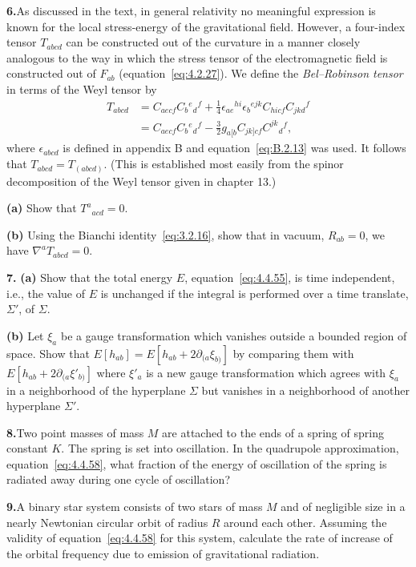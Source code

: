 \medskip
\noindent\textbf{6.}\label{prob:4.6}\quad As discussed in the text, in general
relativity no meaningful expression is known for the local stress-energy of the
gravitational field. However, a four-index tensor \(T_{abcd}\) can be constructed
out of the curvature in a manner closely analogous to the way in which the stress
tensor of the electromagnetic field is constructed out of \(F_{ab}\)
(equation~\eqref{eq:4.2.27}). We define the \emph{Bel--Robinson tensor} in terms
of the Weyl tensor by
\begin{align*}
  T_{abcd}
    &=C_{aecf}C_b{}^e{}_d{}^f
      +\frac14\epsilon_{ae}{}^{hi}\epsilon_b{}^{ejk}
        C_{hicf}C_{jkd}{}^f\\
    &=C_{aecf}C_b{}^e{}_d{}^f
      -\frac32g_{a[b}C_{jk]cf}C^{jk}{}_d{}^f ,
\end{align*}
where \(\epsilon_{abcd}\) is defined in appendix B and
equation~\eqref{eq:B.2.13} was used. It follows that
\(T_{abcd}=T_{(abcd)}\). (This is established most easily from the spinor
decomposition of the Weyl tensor given in chapter 13.)

\noindent\textbf{(a)} Show that \(T^a{}_{acd}=0\).

\noindent\textbf{(b)} Using the Bianchi identity~\eqref{eq:3.2.16}, show that in
vacuum, \(R_{ab}=0\), we have \(\nabla^aT_{abcd}=0\).

\medskip
\noindent\textbf{7.}\label{prob:4.7}\quad
\textbf{(a)} Show that the total energy \(E\), equation~\eqref{eq:4.4.55}, is time
independent, i.e., the value of \(E\) is unchanged if the integral is performed over
a time translate, \(\Sigma'\), of \(\Sigma\).

\noindent\textbf{(b)} Let \(\xi_a\) be a gauge transformation which vanishes
outside a bounded region of space. Show that
\(E[h_{ab}]=E[h_{ab}+2\partial_{(a}\xi_{b)}]\) by comparing them with
\(E[h_{ab}+2\partial_{(a}\xi'_{b)}]\) where \(\xi'_a\) is a new gauge
transformation which agrees with \(\xi_a\) in a neighborhood of the hyperplane
\(\Sigma\) but vanishes in a neighborhood of another hyperplane \(\Sigma'\).

\medskip
\noindent\textbf{8.}\label{prob:4.8}\quad Two point masses of mass \(M\) are
attached to the ends of a spring of spring constant \(K\). The spring is set into
oscillation. In the quadrupole approximation, equation~\eqref{eq:4.4.58}, what
fraction of the energy of oscillation of the spring is radiated away during one cycle
of oscillation?

\medskip
\noindent\textbf{9.}\label{prob:4.9}\quad A binary star system consists of two
stars of mass \(M\) and of negligible size in a nearly Newtonian circular orbit of
radius \(R\) around each other. Assuming the validity of
equation~\eqref{eq:4.4.58} for this system, calculate the rate of increase of the
orbital frequency due to emission of gravitational radiation.
